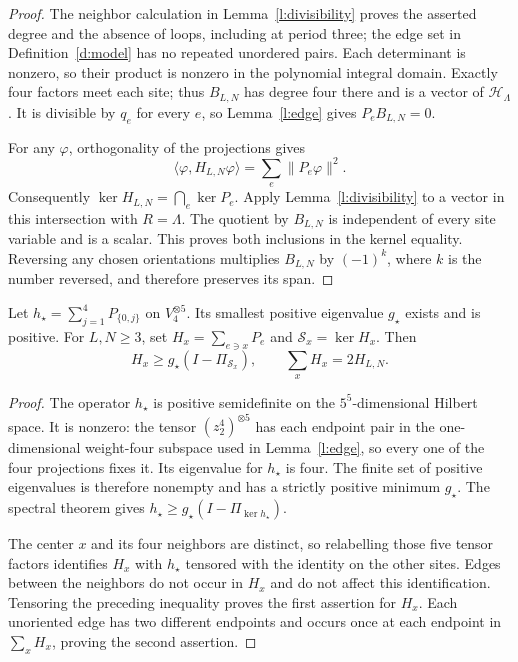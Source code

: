 \begin{proof}
The neighbor calculation in Lemma~\ref{l:divisibility} proves
the asserted degree and the absence of loops, including at period
three; the edge set in Definition~\ref{d:model} has no repeated
unordered pairs. Each determinant is nonzero, so their product is
nonzero in the polynomial integral domain. Exactly four factors
meet each site; thus \(B_{L,N}\) has degree four there and is a
vector of \(\mathcal H_\Lambda\).
It is divisible by \(q_e\) for every \(e\), so
Lemma~\ref{l:edge} gives \(P_eB_{L,N}=0\).

For any \(\varphi\), orthogonality of the projections gives
\[
 \langle\varphi,H_{L,N}\varphi\rangle
       =\sum_e\|P_e\varphi\|^2.
\]
Consequently \(\ker H_{L,N}=\bigcap_e\ker P_e\).
Apply Lemma~\ref{l:divisibility} to a vector in this intersection
with \(R=\Lambda\). The quotient by \(B_{L,N}\) is independent
of every site variable and is a scalar. This proves both inclusions
in the kernel equality. Reversing any chosen orientations multiplies
\(B_{L,N}\) by \((-1)^k\), where \(k\) is the number reversed,
and therefore preserves its span.
\end{proof}

\begin{lemma}\label{l:star}
Let \(h_\star=\sum_{j=1}^4P_{\{0,j\}}\) on \(V_4^{\otimes5}\).
Its smallest positive eigenvalue \(g_\star\) exists and is positive.
For \(L,N\ge3\), set \(H_x=\sum_{e\ni x}P_e\) and
\(\mathcal S_x=\ker H_x\). Then
\[
 H_x\ge g_\star(I-\Pi_{\mathcal S_x}),\qquad
 \sum_xH_x=2H_{L,N}.
\]
\end{lemma}

\begin{proof}
The operator \(h_\star\) is positive semidefinite on the
\(5^5\)-dimensional Hilbert space. It is nonzero: the tensor
\((z_2^4)^{\otimes5}\) has each endpoint pair in the
one-dimensional weight-four subspace used in Lemma~\ref{l:edge},
so every one of the four projections fixes it. Its eigenvalue for
\(h_\star\) is four. The finite set of positive eigenvalues is
therefore nonempty and has a strictly positive minimum \(g_\star\).
The spectral theorem gives
\(h_\star\ge g_\star(I-\Pi_{\ker h_\star})\).

The center \(x\) and its four neighbors are distinct, so relabelling
those five tensor factors identifies \(H_x\) with
\(h_\star\) tensored with the identity on the other sites.
Edges between the neighbors do not occur in \(H_x\) and do not
affect this identification. Tensoring the preceding inequality
proves the first assertion for \(H_x\). Each unoriented edge has
two different endpoints and occurs once at each endpoint in
\(\sum_xH_x\), proving the second assertion.
\end{proof}

